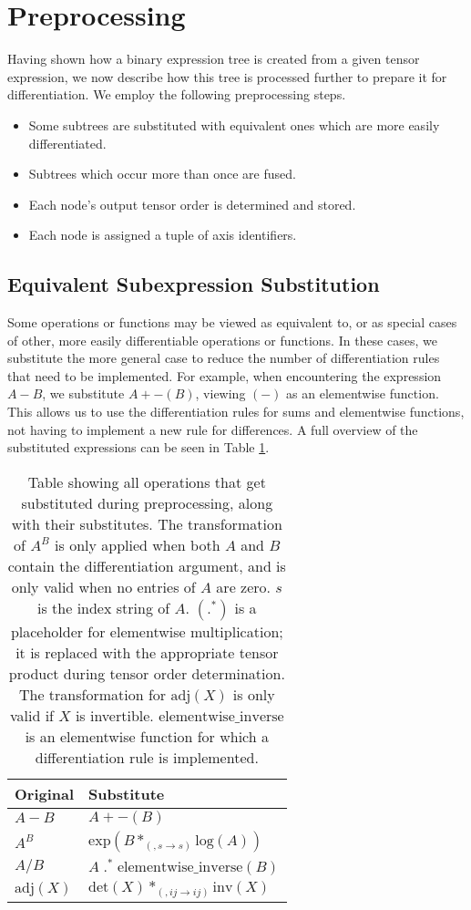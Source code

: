 \documentclass[12pt, a4paper]{report}
\begin{document}
\FloatBarrier
\section{Preprocessing}
Having shown how a binary expression tree is created from a given tensor expression, we now describe how this tree is processed further to prepare it for differentiation.
We employ the following preprocessing steps.
\begin{itemize}
    \item Some subtrees are substituted with equivalent ones which are more easily differentiated.
    \item Subtrees which occur more than once are fused.
    \item Each node's output tensor order is determined and stored.
    \item Each node is assigned a tuple of axis identifiers.
\end{itemize}

\subsection{Equivalent Subexpression Substitution}
Some operations or functions may be viewed as equivalent to, or as special cases of other, more easily differentiable operations or functions.
In these cases, we substitute the more general case to reduce the number of differentiation rules that need to be implemented.
For example, when encountering the expression $A - B$, we substitute $A + -(B)$, viewing $(-)$ as an elementwise function.
This allows us to use the differentiation rules for sums and elementwise functions, not having to implement a new rule for differences.
A full overview of the substituted expressions can be seen in Table \ref{tab:substitutions}.
\begin{table}[ht]
    \centering
    \begin{tabular}{l | l}
        Original & Substitute \\\hline
        $A-B$ & $A + -(B)$ \\
        $A^B$ & $\text{exp}(B *_{(,s \rightarrow s)} \text{log}(A))$ \\
        $A/B$ & $A \;.^*\; \text{elementwise\_inverse}(B)$ \\
        $\text{adj}(X)$ & $\text{det}(X) *_{(,ij \rightarrow ij)} \text{inv}(X)$ \\ 
    \end{tabular}
    \caption[Subexpression Substitutions Applied During Preprocessing]{Table showing all operations that get substituted during preprocessing, along with their substitutes. The transformation of $A^B$ is only applied when both $A$ and $B$ contain the differentiation argument, and is only valid when no entries of $A$ are zero. $s$ is the index string of $A$. $(.^*)$ is a placeholder for elementwise multiplication; it is replaced with the appropriate tensor product during tensor order determination. The transformation for $\text{adj}(X)$ is only valid if $X$ is invertible. $\text{elementwise\_inverse}$ is an elementwise function for which a differentiation rule is implemented.}
    \label{tab:substitutions}
\end{table}
\FloatBarrier
\end{document}
